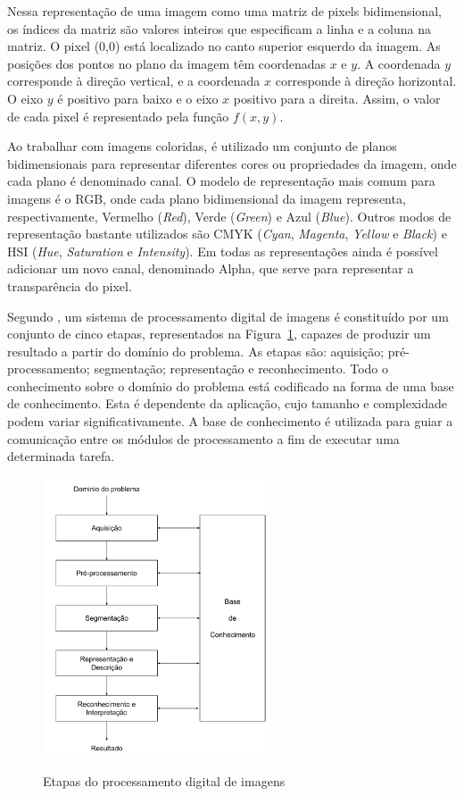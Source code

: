 \documentclass[12pt,oneside,a4paper,english,french,spanish,brazil,]{abntex2}
\begin{document}
Nessa representação de uma imagem como uma matriz de pixels bidimensional, os índices da matriz são valores inteiros que especificam a linha e a coluna na matriz. O pixel (0,0) está localizado no canto superior esquerdo da imagem. As posições dos pontos no plano da imagem têm coordenadas \(x\) e \(y\). A coordenada \(y\) corresponde à direção vertical, e a coordenada \(x\) corresponde à direção horizontal. O eixo \(y\) é positivo para baixo e o eixo \(x\) positivo para a direita. Assim, o valor de cada pixel é representado pela função \(f(x,y)\).

Ao trabalhar com imagens coloridas, é utilizado um conjunto de planos bidimensionais para representar diferentes cores ou propriedades da imagem, onde cada plano é denominado canal. O modelo de representação mais comum para imagens é o RGB, onde cada plano bidimensional da imagem representa, respectivamente, Vermelho (\textit{Red}), Verde (\textit{Green}) e Azul (\textit{Blue}). Outros modos de representação bastante utilizados são CMYK (\textit{Cyan}, \textit{Magenta}, \textit{Yellow} e \textit{Black}) e HSI (\textit{Hue}, \textit{Saturation} e \textit{Intensity}). Em todas as representações ainda é possível adicionar um novo canal, denominado Alpha, que serve para representar a transparência do pixel.

Segundo \citet{pedrini:2008}, um sistema de processamento digital de imagens é constituído por um conjunto de cinco etapas, representados na Figura~\ref{fig:PDI_Etapas_PDI}, capazes de produzir um resultado a partir do domínio do problema. As etapas são: aquisição; pré-processamento; segmentação; representação e reconhecimento. Todo o conhecimento sobre o domínio do problema está codificado na forma de uma base de conhecimento. Esta é dependente da aplicação, cujo tamanho e complexidade podem variar significativamente. A base de conhecimento é utilizada para guiar a comunicação entre os módulos de processamento a fim de executar uma determinada tarefa.

\begin{figure}[ht]
\centering
\caption{Etapas do processamento digital de imagens}
\includegraphics[width=0.6\textwidth]{imagens/PDI_Etapas_PDI.pdf}
\label{fig:PDI_Etapas_PDI}
\end{figure}
\end{document}
